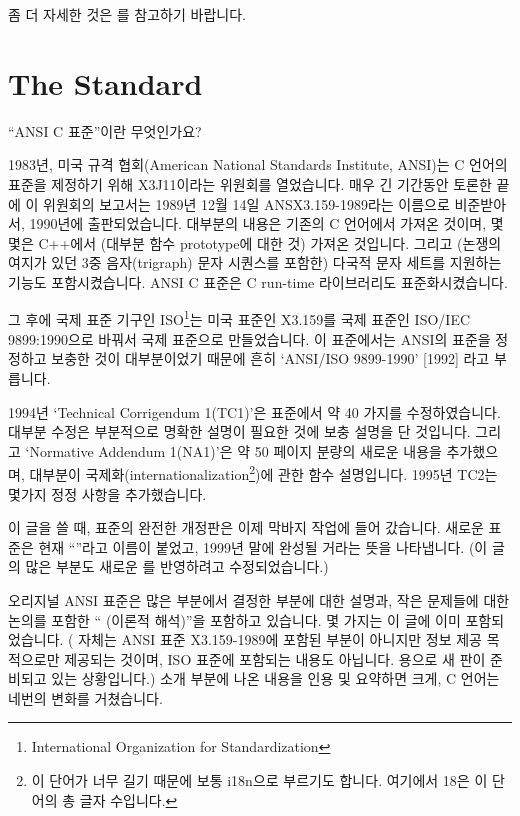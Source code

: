 \noindent 좀 더 자세한 것은 \cite{rational2}를 참고하기 바랍니다.
\section{The Standard}
\begin{faq}
	``ANSI C 표준''이란 무엇인가요?

\A
	1983년, 미국 규격 협회(American National Standards Institute, ANSI)는
	C 언어의 표준을 제정하기 위해 X3J11이라는 위원회를 열었습니다.
	매우 긴 기간동안 토론한 끝에 이 위원회의 보고서는
	1989년 12월 14일 ANSX3.159-1989라는 이름으로 비준받아서, 1990년에
	출판되었습니다.  대부분의 내용은 기존의 C 언어에서 가져온 것이며,
	몇몇은 C++에서 (대부분 함수 prototype에 대한 것) 가져온 것입니다.
	그리고 (논쟁의 여지가 있던 3중 음자(trigraph) 문자 시퀀스를 포함한)
	다국적 문자 세트를 지원하는 기능도 포함시켰습니다.  ANSI C 표준은
	C run-time 라이브러리도 표준화시켰습니다.

	그 후에 국제 표준 기구인 ISO\footnote{International Organization
        for Standardization}는 미국 표준인 X3.159를
	국제 표준인 ISO/IEC 9899:1990으로 바꿔서 국제 표준으로 만들었습니다.
	이 표준에서는 ANSI의 표준을 정정하고 보충한 것이 대부분이었기 때문에
	흔히 `ANSI/ISO 9899-1990' [1992] 라고 부릅니다.

	1994년 `Technical Corrigendum 1(TC1)'은 표준에서 약 40 가지를
	수정하였습니다.  대부분 수정은 부분적으로 명확한 설명이 필요한 것에
	보충 설명을 단 것입니다.  그리고 `Normative Addendum 1(NA1)'은 약
	50 페이지 분량의 새로운 내용을 추가했으며, 대부분이
	국제화(internationalization\footnote{이 단어가 너무 길기 때문에
          보통 i18n으로 부르기도 합니다. 여기에서 18은 이 단어의 총 글자 
          수입니다.})에 관한 함수 설명입니다.
	1995년 TC2는 몇가지 정정 사항을 추가했습니다.

	이 글을 쓸 때, 표준의 완전한 개정판은 이제 막바지 작업에
	들어 갔습니다.  새로운 표준은 현재 ``\cite{c9x}''라고 이름이 붙었고,
	1999년 말에 완성될 거라는 뜻을 나타냅니다.  (이 글의 많은
	부분도 새로운 \cite{c9x}를 반영하려고 수정되었습니다.)

	오리지널 ANSI 표준은 많은 부분에서 결정한 부분에 대한 설명과,
	작은 문제들에 대한 논의를 포함한 ``\cite{rationale} (이론적 해석)''을
	포함하고 있습니다.  몇 가지는 이 글에 이미 포함되었습니다.
	(\cite{rationale} 자체는 ANSI 표준 X3.159-1989에 포함된 부분이 아니지만
	정보 제공 목적으로만 제공되는 것이며, ISO 표준에 포함되는 내용도
	아닙니다.  \cite{c9x} 용으로 새 판이 준비되고 있는 상황입니다.)
\T
	\cite{hs5} 소개 부분에 나온 내용을 인용 및 요약하면 
        크게, C 언어는 네번의 변화를 거쳤습니다.


\end{faq}
